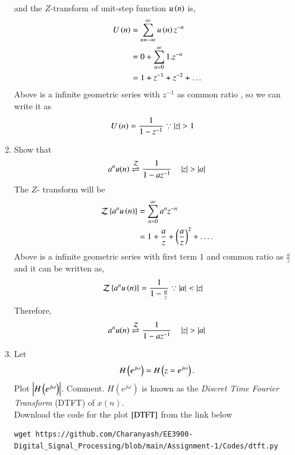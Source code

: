 \documentclass[journal,12pt,twocolumn]{IEEEtran}
\renewcommand\thesection{\arabic{section}}
\begin{document}
\begin{enumerate}[label=\thesection.\arabic*]
\begin{align}
      \end{align}
       and the $Z$-transform of unit-step function $u\left(n\right)$ is,
      \begin{align}
          U\left(n\right) &= \sum_{n=-\infty}^{\infty}u\left(n\right)z^{-n}\\
                    &= 0 + \sum_{n = 0}^{\infty}1.z^{-n}\\
                    &= 1 + z^{-1} + z^{-2} + .\,.\,.
      \end{align}
       Above is a infinite geometric series with $z^{-1}$ as common ratio , so we can write it as 
      \begin{align}
          U\left(n\right) &= \frac{1}{1-z^{-1}} \because \left\vert z\right\vert > 1
      \end{align} 
    \item Show that 
      \begin{equation}
        \label{eq:anun}
        a^nu(n) \overset{\mathcal{Z}}{ \rightleftharpoons} \frac{1}{1-az^{-1}} \quad \left\vert z\right\vert > \left\vert a\right\vert
      \end{equation}
    \solution
     The $Z$- transform will be 
      \begin{align}
              \mathcal{Z}\left\{a^nu\left(n\right)\right\} &= \sum_{n = 0}^{\infty}a^{n}z^{-n}\\
                                              &= 1 + \frac{a}{z} + \left(\frac{a}{z}\right)^2 + .\,.\,.\,.
      \end{align}
     Above is a infinite geometric series with first term $1$ and common ratio as $\frac{a}{z}$ and it can 
       be written as,
      \begin{align}
              \mathcal{Z}\left\{a^nu\left(n\right)\right\} &= \frac{1}{1 - \frac{a}{z}} \because \left\vert a\right\vert < \left\vert z\right\vert 
      \end{align}
     Therefore,
      \begin{equation}
          a^nu(n) \overset{\mathcal{Z}}{ \rightleftharpoons} \frac{1}{1-az^{-1}} \quad \left\vert z\right\vert > \left\vert a\right\vert
      \end{equation}
    \item 
      Let
      \begin{equation}
        H\left(e^{j \omega}\right) = H\left(z = e^{j \omega}\right).
      \end{equation}
      Plot $\left\vert H\left(e^{j \omega}\right)\right\vert$.  Comment.  $H(e^{j \omega})$ is known as the {\em Discret Time Fourier Transform} (DTFT) of $x(n)$.\\
    \solution
        Download the code for the plot $\ref{DTFT}$ from the link below
      \begin{lstlisting}
wget https://github.com/Charanyash/EE3900-Digital_Signal_Processing/blob/main/Assignment-1/Codes/dtft.py

\end{lstlisting}
\end{enumerate}
\end{document}
